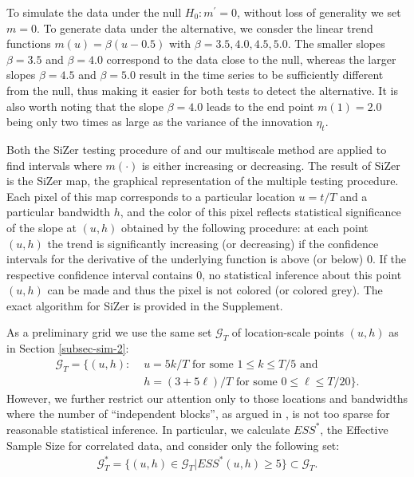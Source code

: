 \documentclass[a4paper,12pt]{article}
\begin{document}
To simulate the data under the null $H_0: m^\prime = 0$, without loss of generality we set $ m = 0$. To generate data under the alternative, we consder the linear trend functions $m(u) = \beta (u - 0.5)$ with $\beta = 3.5, 4.0, 4.5, 5.0$. The smaller slopes $\beta = 3.5$ and $\beta = 4.0$ correspond to the data close to the null, whereas the larger slopes $\beta = 4.5$ and $\beta = 5.0$ result in the time series to be sufficiently different from the null, thus making it easier for both tests to detect the alternative. It is also worth noting that the slope $\beta = 4.0$ leads to the end point $m(1) = 2.0$ being only two times as large as the variance of the innovation $\eta_t$.
 
Both the SiZer testing procedure of \cite{Rondonotti2007} and our multiscale method are applied to find intervals where $m(\cdot)$ is either increasing or decreasing. The result of SiZer is the SiZer map, the graphical representation of the multiple testing procedure. Each pixel of this map corresponds to a particular location $u = t/T$ and a particular bandwidth $h$, and the color of this pixel reflects statistical significance of the slope at $(u, h)$ obtained by the following procedure: at each point $(u, h)$ the trend is significantly increasing (or decreasing) if the confidence intervals for the derivative of the underlying function is above (or below) $0$. If the respective confidence interval contains $0$, no statistical inference about this point $(u, h)$ can be made and thus the pixel is not colored (or colored grey). The exact algorithm for SiZer is provided in the Supplement. 

As a preliminary grid we use the same set $\mathcal{G}_T$ of location-scale points $(u,h)$ as in Section \ref{subsec-sim-2}:
\begin{align}
\mathcal{G}_T = \big\{ (u, h): & \, \, u = 5k/T \text{ for some } 1 \le k \le T/5 \text{ and } \nonumber \\ & \, \, h = (3+5\ell)/T \text{ for some } 0 \le \ell \le T/20 \big\}.
\end{align}
However, we further restrict our attention only to those locations and bandwidths where the number of ``independent blocks'', as argued in \cite{Rondonotti2007}, is not too sparse for reasonable statistical inference. In particular, we calculate $ESS^*$, the Effective Sample Size for correlated data, and consider only the following set:
\begin{align}
\mathcal{G}_T^*  = \big\{ (u, h)\in \mathcal{G}_T| ESS^*(u, h) \geq 5\}\subset \mathcal{G}_T.
\end{align}
\end{document}
